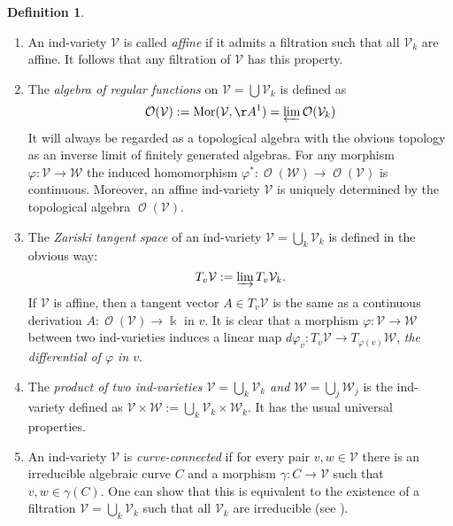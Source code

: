 \documentclass{amsart}
\theoremstyle{definition}
\newtheorem{defn}[thm]{Definition}
\theoremstyle{remark}
\begin{document}
\begin{defn}\label{affine-algebraic.def}\strut
\begin{enumerate}
\item An ind-variety ${\mathcal V}$ is called {\it affine} if it admits a filtration such that all ${\mathcal V}_{k}$ are affine. It follows that any filtration of ${\mathcal V}$ has this property. 
\item The {\it algebra of regular functions\/} on ${\mathcal V}=\bigcup {\mathcal V}_{k}$ is defined as 
$$
\operatorname{\mathcal O}({\mathcal V}):= \operatorname{Mor}({\mathcal V},{\AA^{1}}) = \varprojlim \operatorname{\mathcal O}({\mathcal V}_{k})
$$
It will always be regarded as a topological algebra with the obvious topology as an inverse  limit of finitely generated algebras. For any morphism ${\varphi}\colon {\mathcal V} \to {\mathcal W}$ the induced homomorphism ${\varphi}^{*}\colon\operatorname{\mathcal O}({\mathcal W}) \to \operatorname{\mathcal O}({\mathcal V})$ is continuous. Moreover, an affine ind-variety ${\mathcal V}$ is uniquely determined by the topological algebra $\operatorname{\mathcal O}({\mathcal V})$.
\item
The {\it Zariski tangent space\/} of an ind-variety ${\mathcal V}=\bigcup_{k}{\mathcal V}_{k}$ is defined in the obvious way:
$$
T_{v}{\mathcal V}:=\varinjlim T_{v}{\mathcal V}_{k}.
$$
If ${\mathcal V}$ is affine, then a tangent vector $A \in T_{v}{\mathcal V}$ is the same as a continuous derivation $A\colon\operatorname{\mathcal O}({\mathcal V})\to {\Bbbk}$ in $v$. It is clear that a morphism ${\varphi}\colon {\mathcal V} \to {\mathcal W}$ between two ind-varieties induces a linear map $d{\varphi}_{v}\colon T_{v}{\mathcal V} \to T_{{\varphi}(v)}{\mathcal W}$, {\it the differential of ${\varphi}$ in $v$}.
\item
The {\it product of two ind-varieties ${\mathcal V}=\bigcup_{k}{\mathcal V}_{k}$ and ${\mathcal W}=\bigcup_{j} {\mathcal W}_{j}$\/} is the ind-variety defined as ${\mathcal V}\times{\mathcal W}:=\bigcup_{k}{\mathcal V}_{k}\times {\mathcal W}_{k}$. It has the usual universal properties.
\item An ind-variety ${\mathcal V}$ is {\it curve-connected} if for every pair $v,w \in {\mathcal V}$ there is an irreducible algebraic curve $C$ and a morphism $\gamma\colon C \to {\mathcal V}$ such that $v,w \in\gamma(C)$. One can show that this is equivalent to the existence of a filtration ${\mathcal V}=\bigcup_{k}{\mathcal V}_{k}$ such that all ${\mathcal V}_{k}$ are irreducible (see \cite{FuKr2015On-the-geometry-of}).
\end{enumerate}
\end{defn}
\end{document}
